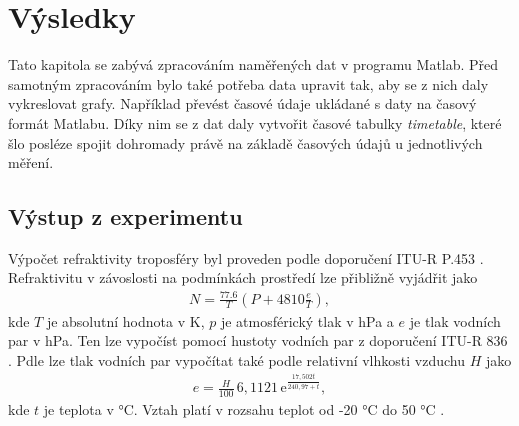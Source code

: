 \documentclass[twoside]{ctuthesis}
\newcommand{\mt}[1]{\text{#1}}
\theoremstyle{plain}
\theoremstyle{definition}
\theoremstyle{note}
\begin{document}
\chapter{Výsledky}
	Tato kapitola se zabývá zpracováním naměřených dat v programu Matlab. Před samotným zpracováním bylo také potřeba data upravit tak, aby se z nich daly vykreslovat grafy. Například převést časové údaje ukládané s daty na časový formát Matlabu. Díky nim se z dat daly vytvořit časové tabulky \textit{timetable}, které šlo posléze spojit dohromady právě na základě časových údajů u jednotlivých měření. 

	\section{Výstup z experimentu}


	Výpočet refraktivity troposféry byl proveden podle doporučení ITU-R P.453 \cite{ITU:refrac}. Refraktivitu v závoslosti na podmínkách prostředí lze přibližně vyjádřit jako
	\begin{align}
		N = \frac{77.6}{T} \left(P + 4810\frac{e}{T}\right),
		\label{eq:refr:meas}
	\end{align}
	kde $T$ je absolutní hodnota v K, $p$ je atmosférický tlak v hPa a $e$ je tlak vodních par v hPa. Ten lze vypočíst pomocí hustoty vodních par z doporučení ITU-R 836 \cite{ITU:vapour}. Pdle \cite{ITU:refrac} lze tlak vodních par vypočítat také podle relativní vlhkosti vzduchu $H$ jako
	\begin{align}
		e = \frac{H}{100}\,6{,}1121\,\mt{e}^{\frac{17{,}502t}{240{,}97 + t}},
	\end{align}
	kde $t$ je teplota v °C. Vztah platí v rozsahu teplot od -20 °C do 50 °C \cite{zaklady:sireni:vln}.
\end{document}
